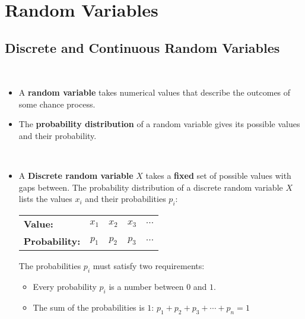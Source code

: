\documentclass[Main.tex]{subfiles}
\begin{document}
	
	\chapter{Random Variables}
	
	
	\section{Discrete and Continuous Random Variables}
	
	\begin{example} \hfill \\
		\begin{itemize}	
			\item A \textbf{random variable} takes numerical values that describe the outcomes of some chance process.\\
			\item The \textbf{probability distribution} of a random variable gives its possible values and their probability.
		\end{itemize}
	\end{example}
	
	\begin{example} \hfill \\
		\begin{itemize}	
			\item A \textbf{Discrete random variable} $X$ takes a \textbf{fixed} set of possible values with gaps between. The probability distribution of a discrete random variable $X$ lists the values $x_{i}$ and their probabilities $p_{i}$:			
			\begin{table}[H]
				\centering
				\begin{tabular}{lcccr}
					\hline
					\textbf{Value:} & $x_{1}$ & $x_{2}$ & $x_{3}$ & $\cdots$ \\
					\textbf{Probability:} & $p_{1}$ & $p_{2}$ & $p_{3}$ & $\cdots$ \\
					\hline
				\end{tabular}
			\end{table}
			The probabilities $p_{i}$ must satisfy two requirements:\\			
			\begin{itemize}
				\item Every probability $p_{i}$ is a number between $0$ and $1$.\\
				\item The sum of the probabilities is $1$: $p_{1}+p_{2}+p_{3}+\cdots +p_{n}=1$	
			\end{itemize}							
		\end{itemize}
	\end{example}
	
\end{document}
